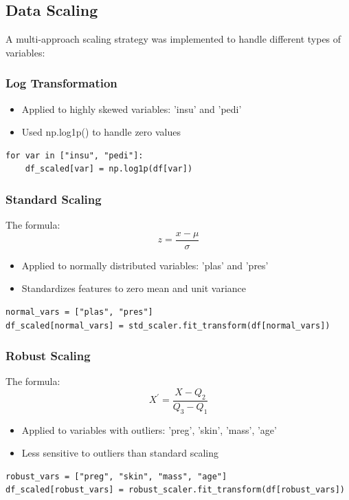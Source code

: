 \documentclass[a4paper,12pt]{article}
\begin{document}
\subsection{Data Scaling}
A multi-approach scaling strategy was implemented to handle different types of variables:
\subsubsection*{Log Transformation}
\begin{itemize}
    \item{Applied to highly skewed variables: 'insu' and 'pedi'}
    \item{Used np.log1p() to handle zero values}
\end{itemize}
\begin{lstlisting}[style=python]
for var in ["insu", "pedi"]:
    df_scaled[var] = np.log1p(df[var])
\end{lstlisting}

\subsubsection*{Standard Scaling}
The formula:
\[z=\frac{x-\mu}{\sigma}\]

\begin{itemize}
    \item{Applied to normally distributed variables: 'plas' and 'pres'}
    \item{Standardizes features to zero mean and unit variance}
\end{itemize}

\begin{lstlisting}[style=python]
normal_vars = ["plas", "pres"]
df_scaled[normal_vars] = std_scaler.fit_transform(df[normal_vars])
\end{lstlisting}

\subsubsection*{Robust Scaling}
The formula:
\[X^{'}=\frac{X-Q_{2}}{Q_{3}-Q_{1}}\]

\begin{itemize}
    \item{Applied to variables with outliers: 'preg', 'skin', 'mass', 'age'}
    \item{Less sensitive to outliers than standard scaling}
\end{itemize}

\begin{lstlisting}[style=python]
robust_vars = ["preg", "skin", "mass", "age"]
df_scaled[robust_vars] = robust_scaler.fit_transform(df[robust_vars])
\end{lstlisting}
\end{document}
